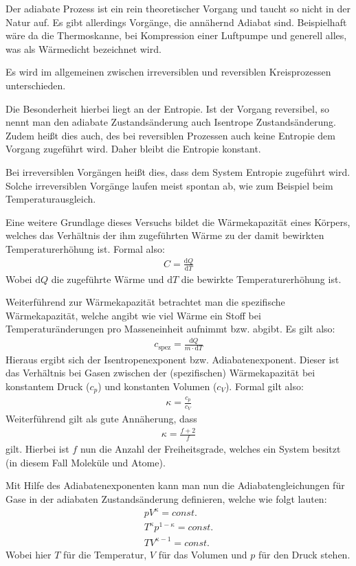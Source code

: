 \documentclass[fontsize=12pt]{scrartcl}
\begin{document}
Der adiabate Prozess ist ein rein theoretischer Vorgang und taucht so nicht in der Natur auf. Es gibt allerdings Vorgänge, die annähernd Adiabat sind. Beispielhaft wäre da die Thermoskanne, bei Kompression einer Luftpumpe und generell alles, was als \glqq Wärmedicht \grqq bezeichnet wird. \par

Es wird im allgemeinen zwischen irreversiblen und reversiblen Kreisprozessen unterschieden. \par

Die Besonderheit hierbei liegt an der Entropie. Ist der Vorgang reversibel, so nennt man den adiabate Zustandsänderung auch Isentrope Zustandsänderung. Zudem heißt dies auch, des bei reversiblen Prozessen auch keine Entropie dem Vorgang zugeführt wird. Daher bleibt die Entropie konstant. \par

Bei irreversiblen Vorgängen heißt dies, dass dem System Entropie zugeführt wird. Solche irreversiblen Vorgänge laufen meist spontan ab, wie zum Beispiel beim Temperaturausgleich. 

Eine weitere Grundlage dieses Versuchs bildet die Wärmekapazität eines Körpers, welches das Verhältnis der ihm zugeführten Wärme zu der damit bewirkten Temperaturerhöhung ist. Formal also:
\begin{align*}
C=\frac{\text{d}Q}{\text{d}T}
\end{align*}
Wobei $\text{d}Q$ die zugeführte Wärme und $\text{d}T$ die bewirkte Temperaturerhöhung ist. \par
\newpage
Weiterführend zur Wärmekapazität betrachtet man die spezifische Wärmekapazität, welche angibt wie viel Wärme ein Stoff bei Temperaturänderungen pro Masseneinheit aufnimmt bzw. abgibt. Es gilt also:
\begin{align*}
c_{\text{spez}}=\frac{\text{d}Q}{m\cdot \text{d}T}
\end{align*}
Hieraus ergibt sich der Isentropenexponent bzw. Adiabatenexponent. Dieser ist das Verhältnis bei Gasen zwischen der (spezifischen) Wärmekapazität bei konstantem Druck ($c_p$) und konstanten Volumen ($c_V$). Formal gilt also:
\begin{align*}
\kappa = \frac{c_p}{c_V}
\end{align*}
Weiterführend gilt als gute Annäherung, dass
\begin{align*}
\kappa = \frac{f+2}{f}
\end{align*}
gilt. Hierbei ist $f$ nun die Anzahl der Freiheitsgrade, welches ein System besitzt (in diesem Fall Moleküle und Atome). \par
Mit Hilfe des Adiabatenexponenten kann man nun die Adiabatengleichungen für Gase in der adiabaten Zustandsänderung definieren, welche wie folgt lauten:
\begin{align*}
pV^{\kappa} = const. \\
T^{\kappa}p^{1-\kappa} = const. \\
TV^{\kappa-1}=const.
\end{align*}
Wobei hier $T$ für die Temperatur, $V$ für das Volumen und $p$ für den Druck stehen.
\newpage
\end{document}
